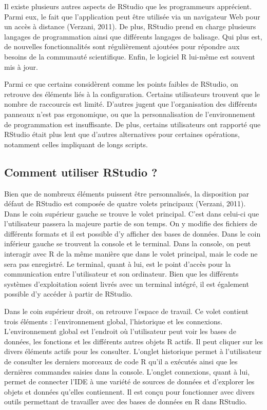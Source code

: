 \documentclass[
  letterpaper,
  DIV=11,
  numbers=noendperiod]{scrreprt}
\begin{document}
Il existe plusieurs autres aspects de RStudio que les programmeurs
apprécient. Parmi eux, le fait que l'application peut être utilisée via
un navigateur Web pour un accès à distance (Verzani, 2011). De plus,
RStudio prend en charge plusieurs langages de programmation ainsi que
différents langages de balisage. Qui plus est, de nouvelles
fonctionnalités sont régulièrement ajoutées pour répondre aux besoins de
la communauté scientifique. Enfin, le logiciel R lui-même est souvent
mis à jour.

Parmi ce que certains considèrent comme les points faibles de RStudio,
on retrouve des éléments liés à la configuration. Certains utilisateurs
trouvent que le nombre de raccourcis est limité. D'autres jugent que
l'organisation des différents panneaux n'est pas ergonomique, ou que la
personnalisation de l'environnement de programmation est insuffisante.
De plus, certains utilisateurs ont rapporté que RStudio était plus lent
que d'autres alternatives pour certaines opérations, notamment celles
impliquant de longs scripts.

\hypertarget{comment-utiliser-rstudio}{%
\subsection{Comment utiliser RStudio ?}\label{comment-utiliser-rstudio}}

Bien que de nombreux éléments puissent être personnalisés, la
disposition par défaut de RStudio est composée de quatre volets
principaux (Verzani, 2011). Dans le coin supérieur gauche se trouve le
volet principal. C'est dans celui-ci que l'utilisateur passera la
majeure partie de son temps. On y modifie des fichiers de différents
formats et il est possible d'y afficher des bases de données. Dans le
coin inférieur gauche se trouvent la console et le terminal. Dans la
console, on peut interagir avec R de la même manière que dans le volet
principal, mais le code ne sera pas enregistré. Le terminal, quant à
lui, est le point d'accès pour la communication entre l'utilisateur et
son ordinateur. Bien que les différents systèmes d'exploitation soient
livrés avec un terminal intégré, il est également possible d'y accéder à
partir de RStudio.

Dans le coin supérieur droit, on retrouve l'espace de travail. Ce volet
contient trois éléments : l'environnement global, l'historique et les
connexions. L'environnement global est l'endroit où l'utilisateur peut
voir les bases de données, les fonctions et les différents autres objets
R actifs. Il peut cliquer sur les divers éléments actifs pour les
consulter. L'onglet historique permet à l'utilisateur de consulter les
derniers morceaux de code R qu'il a exécutés ainsi que les dernières
commandes saisies dans la console. L'onglet connexions, quant à lui,
permet de connecter l'IDE à une variété de sources de données et
d'explorer les objets et données qu'elles contiennent. Il est conçu pour
fonctionner avec divers outils permettant de travailler avec des bases
de données en R dans RStudio.
\end{document}
